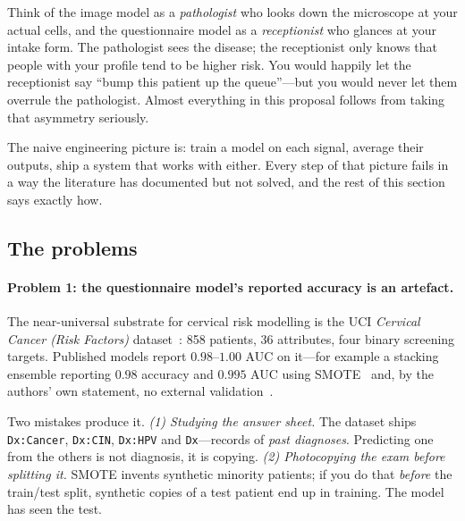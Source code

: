 \documentclass[sigplan,nonacm,screen]{acmart}
\begin{document}
\begin{exbox}
Think of the image model as a \emph{pathologist} who looks down the microscope at your actual cells, and the questionnaire model as a \emph{receptionist} who glances at your intake form. The pathologist sees the disease; the receptionist only knows that people with your profile tend to be higher risk. You would happily let the receptionist say ``bump this patient up the queue''---but you would never let them overrule the pathologist. Almost everything in this proposal follows from taking that asymmetry seriously.
\end{exbox}

The naive engineering picture is: train a model on each signal, average their outputs, ship a system that works with either. Every step of that picture fails in a way the literature has documented but not solved, and the rest of this section says exactly how.

\subsection{The problems}

\paragraph{Problem 1: the questionnaire model's reported accuracy is an artefact.}
The near-universal substrate for cervical risk modelling is the UCI \emph{Cervical Cancer (Risk Factors)} dataset~\cite{fernandes2017transfer}: 858 patients, 36 attributes, four binary screening targets. Published models report $0.98$--$1.00$ AUC on it---for example a stacking ensemble reporting $0.98$ accuracy and $0.995$ AUC using SMOTE~\cite{chawla2002smote} and, by the authors' own statement, no external validation~\cite{roy2025interpretable}.

\begin{exbox}
Two mistakes produce it. \emph{(1) Studying the answer sheet.} The dataset ships \texttt{Dx:Cancer}, \texttt{Dx:CIN}, \texttt{Dx:HPV} and \texttt{Dx}---records of \emph{past diagnoses}. Predicting one from the others is not diagnosis, it is copying. \emph{(2) Photocopying the exam before splitting it.} SMOTE invents synthetic minority patients; if you do that \emph{before} the train/test split, synthetic copies of a test patient end up in training. The model has seen the test.
\end{exbox}
\end{document}
